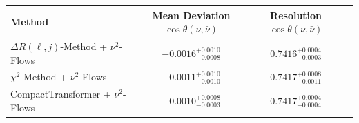    \begin{tabular}{lccc}
        \toprule
        Method & Mean Deviation $\cos\theta(\nu, \bar{\nu})$ & Resolution $\cos\theta(\nu, \bar{\nu})$ \\
        \midrule
        $\Delta R(\ell,j)$-Method + $\nu^2$-Flows & $-0.0016^{+0.0010}_{-0.0008}$ & $0.7416^{+0.0004}_{-0.0003}$ \\
        $\chi^2$-Method + $\nu^2$-Flows & $-0.0011^{+0.0010}_{-0.0010}$ & $0.7417^{+0.0008}_{-0.0011}$ \\
        CompactTransformer + $\nu^2$-Flows & $-0.0010^{+0.0008}_{-0.0003}$ & $0.7417^{+0.0004}_{-0.0004}$ \\
        \bottomrule
    \end{tabular}